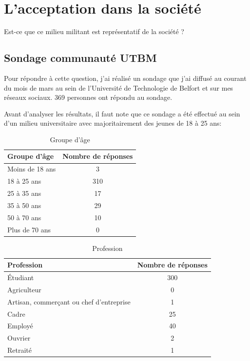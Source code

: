 \documentclass[12pt,a4paper]{report}
\begin{document}
\section{L'acceptation dans la société}

Est-ce que ce milieu militant est représentatif de la société ?

\subsection{Sondage communauté UTBM}
Pour répondre à cette question, j'ai réalisé un sondage que j'ai diffusé au courant du mois de mars au sein de l'Université de Technologie de Belfort et sur mes réseaux sociaux. 369 personnes ont répondu au sondage.

Avant d'analyser les résultats, il faut note que ce sondage a été effectué au sein d'un milieu universitaire avec majoritairement des jeunes de 18 à 25 ans:

\begin{table}[H]
    \centering
    \begin{tabular}{|l|c|}
    \hline
    \textbf{Groupe d'âge} & \textbf{Nombre de réponses} \\
    \hline
    Moins de 18 ans & 3 \\
    18 à 25 ans & 310 \\
    25 à 35 ans & 17 \\
    35 à 50 ans & 29 \\
    50 à 70 ans & 10 \\
    Plus de 70 ans & 0 \\
    \hline
    \end{tabular}
    \caption{Groupe d'âge}
\end{table}
    
\begin{table}[H]
    \centering
    \begin{tabular}{|l|c|}
    \hline
    \textbf{Profession} & \textbf{Nombre de réponses} \\
    \hline
    Étudiant & 300 \\
    Agriculteur & 0 \\
    Artisan, commerçant ou chef d'entreprise & 1 \\
    Cadre & 25 \\
    Employé & 40 \\
    Ouvrier & 2 \\
    Retraité & 1 \\
    \hline
    \end{tabular}
    \caption{Profession}
    \label{tab:Profession}
\end{table}
\end{document}
